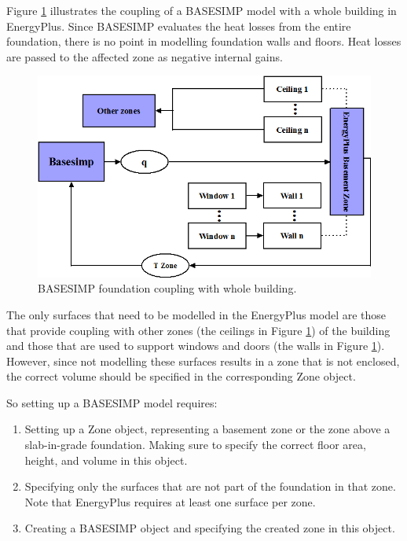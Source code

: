 Figure \ref{fig:BASESIMPCoupling} illustrates the coupling of a BASESIMP model with a whole building in EnergyPlus.  Since BASESIMP evaluates the heat losses from the entire foundation, there is no point in modelling foundation walls and floors.  Heat losses are passed to the affected zone as negative internal gains.
\begin{figure}[htbp]
\centering
\includegraphics{media/image8010.png}
\caption{BASESIMP foundation coupling with whole building.} \label{fig:BASESIMPCoupling}
\end{figure}

The only surfaces that need to be modelled in the EnergyPlus model are those that provide coupling with other zones (the ceilings in Figure \ref{fig:BASESIMPCoupling}) of the building and those that are used to support windows and doors (the walls in Figure \ref{fig:BASESIMPCoupling}).  However, since not modelling these surfaces results in a zone that is not enclosed, the correct volume should be specified in the corresponding Zone object.

So setting up a BASESIMP model requires:
\begin{enumerate}
    \item Setting up a Zone object, representing a basement zone or the zone above a slab-in-grade foundation.  Making sure to specify the correct floor area, height, and volume in this object.
    \item Specifying only the surfaces that are not part of the foundation in that zone.  Note that EnergyPlus requires at least one surface per zone.
    \item Creating a BASESIMP object and specifying the created zone in this object.
\end{enumerate}


